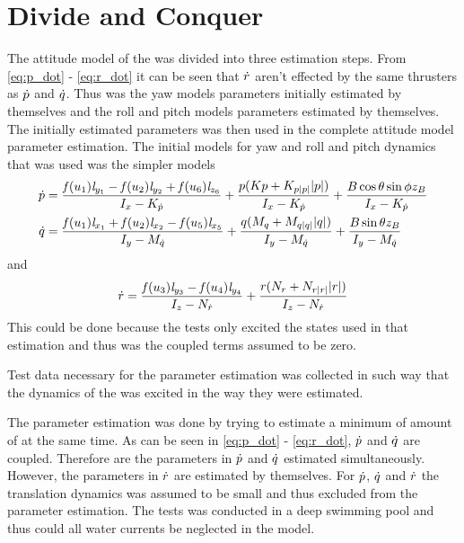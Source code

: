 \section{Divide and Conquer}
The attitude model of the \abbrROV was divided into three estimation steps. From \eqref{eq:p_dot} - \eqref{eq:r_dot} it can be seen that $\dot{r}$ aren't effected by the same thrusters as $\dot{p}$ and $\dot{q}$. Thus was the yaw models parameters initially estimated by themselves and the roll and pitch models parameters estimated by themselves. The initially estimated parameters was then used in the complete attitude model parameter estimation. The initial models for yaw and roll and pitch dynamics that was used was the simpler models
\begin{align} \label{eq:pq_dot_simple}
\dot{p} &= \frac{\mathit{f}(u_{1}) \mathit{l}_{y_{1}} - \mathit{f}(u_{2}) \mathit{l}_{y_{2}} + \mathit{f}(u_{6}) \mathit{l}_{z_{6}}}{I_{x} - K_{\dot{p}}} + \frac{p (Kp + K_{p|p|} |p|)}{I_{x} - K_{\dot{p}}} + \frac{B \cos{\theta} \sin{\phi} z_B}{I_{x} - K_{\dot{p}}} \\
\dot{q} &=\frac{\mathit{f}(u_{1}) \mathit{l}_{x_{1}} + \mathit{f}(u_{2}) \mathit{l}_{x_{2}} - \mathit{f}(u_{5}) \mathit{l}_{x_{5}}}{I_{y} - M_{\dot{q}}} + \frac{q (M_{q} + M_{q|q|} |q|)}{I_{y} - M_{\dot{q}}} + \frac{B \sin{\theta} z_B}{I_{y} - M_{\dot{q}}} 
\end{align} and
\begin{equation} \label{eq:r_dot_simple}
\dot{r} = \frac{\mathit{f}(u_{3}) \mathit{l}_{y_{3}} - \mathit{f}(u_{4}) \mathit{l}_{y_{4}}}{I_{z} - N_{\dot{r}}} + \frac{r (N_{r} + N_{r|r|} |r|)}{I_{z} - N_{\dot{r}}}
\end{equation}
This could be done because the tests only excited the states used in that estimation and thus was the coupled terms assumed to be zero.

Test data necessary for the parameter estimation was collected in such way that the dynamics of the \abbrROV was excited in the way they were estimated. 

The parameter estimation was done by trying to estimate a minimum of amount of \abbrDOF at the same time. As can be seen in \eqref{eq:p_dot} - \eqref{eq:r_dot}, $\dot{p}$ and $\dot{q}$ are coupled. Therefore are the parameters in $\dot{p}$ and $\dot{q}$ estimated simultaneously. However, the parameters in $\dot{r}$ are estimated by themselves. For $\dot{p}$, $\dot{q}$ and $\dot{r}$ the translation dynamics was assumed to be small and thus excluded from the parameter estimation. The tests was conducted in a deep swimming pool and thus could all water currents be neglected in the model. 
